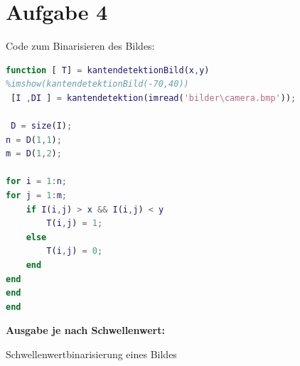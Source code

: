 \documentclass[12pt,a4paper,oneside]{article}
\begin{document}
\newpage

\begin{figure} 
\section*{Aufgabe 4}
Code zum Binarisieren des Bildes:
\begin{lstlisting}[language=Matlab,frame=single]
function [ T] = kantendetektionBild(x,y)
%imshow(kantendetektionBild(-70,40))
 [I ,DI ] = kantendetektion(imread('bilder\camera.bmp'));
 
 D = size(I);
n = D(1,1);
m = D(1,2);

for i = 1:n;
for j = 1:m;
    if I(i,j) > x && I(i,j) < y
        T(i,j) = 1;
    else
        T(i,j) = 0;
    end
end
end
end


\end{lstlisting}

\textbf{Ausgabe je nach Schwellenwert:\\}
\caption{Schwellenwertbinarisierung eines Bildes} 

\end{figure} 
\end{document}
